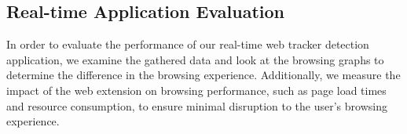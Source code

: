 \subsection{Real-time Application Evaluation}
In order to evaluate the performance of our real-time web tracker detection application, we examine the gathered data 
and look at the browsing graphs to determine the difference in the browsing experience.
Additionally, we measure the impact of the web extension on browsing performance, such as page load times and
resource consumption, to ensure minimal disruption to the user's browsing experience.





